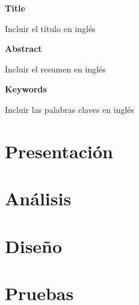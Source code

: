 \documentclass[a4paper,12pt,twoside,final]{book}
\begin{document}

\cleardoublepage

\thispagestyle{empty}
\pagecolor{white}

\Huge{\textbf{Title }}

\normalsize{Incluir el título en inglés}

\Large{\textbf{Abstract }}

\normalsize{Incluir el resumen en inglés}


\textbf{Keywords}

\normalsize{Incluir las palabras claves en inglés}

\clearpage

\thispagestyle{empty}
\pagecolor{white}


\cleardoublepage
\setcounter{page}{1}
\setcounter{tocdepth}{3} %
\setcounter{secnumdepth}{3} %
\tableofcontents
\listoffigures
\listoftables

\afterpage{\null\newpage}
\thispagestyle{empty}
\newpage
\mainmatter
\part{Presentación}






\part{Análisis}



\part{Diseño}




\part{Pruebas}


%
%

%

\cleardoublepage
{}


\printbibheading[heading=bibintoc]
\printbibliography

\renewcommand{\appendixpagename}{Anexos}
\renewcommand{\appendixtocname}{Anexos}
\renewcommand{\appendixname}{Anexo}
\end{document}
